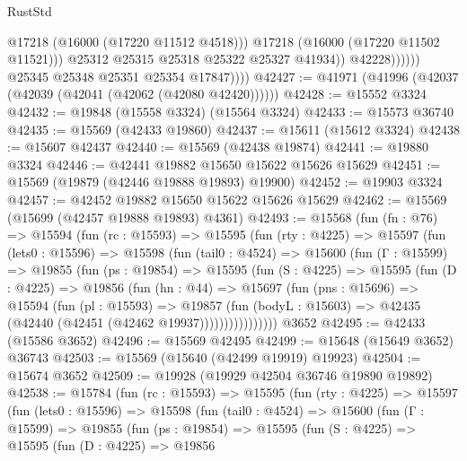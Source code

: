 \begin{lexlean}{RustStd}
\begin{coremodule}
                                @17218
                                (@16000 (@17220 @11512 @4518)))
                              @17218
                              (@16000 (@17220 @11502 @11521)))
                            @25312
                            @25315
                            @25318
                            @25322
                            @25327
                            @41934))
                        @42228))))))
            @25345
            @25348
            @25351
            @25354
            @17847))))
@42427 := @41971 (@41996 (@42037 (@42039 (@42041 (@42062 (@42080 @42420))))))
@42428 := @15552 @3324
@42432 := @19848 (@15558 @3324) (@15564 @3324)
@42433 := @15573 @36740
@42435 := @15569 (@42433 @19860)
@42437 := @15611 (@15612 @3324)
@42438 := @15607 @42437
@42440 := @15569 (@42438 @19874)
@42441 := @19880 @3324
@42446 := @42441 @19882 @15650 @15622 @15626 @15629
@42451 := @15569 (@19879 (@42446 @19888 @19893) @19900)
@42452 := @19903 @3324
@42457 := @42452 @19882 @15650 @15622 @15626 @15629
@42462 := @15569 (@15699 (@42457 @19888 @19893) @4361)
@42493 := @15568
    (fun (fn : @76) =>
    @15594
      (fun (rc : @15593) =>
      @15595
        (fun (rty : @4225) =>
        @15597
          (fun (lets0 : @15596) =>
          @15598
            (fun (tail0 : @4524) =>
            @15600
              (fun (Γ : @15599) =>
              @19855
                (fun (ps : @19854) =>
                @15595
                  (fun (S : @4225) =>
                  @15595
                    (fun (D : @4225) =>
                    @19856
                      (fun (hn : @44) =>
                      @15697
                        (fun (pns : @15696) =>
                        @15594
                          (fun (pl : @15593) =>
                          @19857
                            (fun (bodyL : @15603) =>
                            @42435 (@42440 (@42451 (@42462 @19937))))))))))))))))
    @3652
@42495 := @42433 (@15586 @3652)
@42496 := @15569 @42495
@42499 := @15648 (@15649 @3652) @36743
@42503 := @15569 (@15640 (@42499 @19919) @19923)
@42504 := @15674 @3652
@42509 := @19928 (@19929 @42504 @36746 @19890 @19892)
@42538 := @15784
    (fun (rc : @15593) =>
    @15595
      (fun (rty : @4225) =>
      @15597
        (fun (lets0 : @15596) =>
        @15598
          (fun (tail0 : @4524) =>
          @15600
            (fun (Γ : @15599) =>
            @19855
              (fun (ps : @19854) =>
              @15595
                (fun (S : @4225) =>
                @15595
                  (fun (D : @4225) =>
                  @19856

\end{coremodule}
\end{lexlean}
